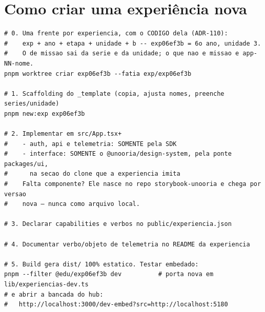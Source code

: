 \section{Como criar uma experiência nova}

\begin{lstlisting}[language=bashunoo, caption={O caminho completo}, label={lst:novaexp}]
# 0. Uma frente por experiencia, com o CODIGO dela (ADR-110):
#    exp + ano + etapa + unidade + b -- exp06ef3b = 6o ano, unidade 3.
#    O de missao sai da serie e da unidade; o que nao e missao e app-NN-nome.
pnpm worktree criar exp06ef3b --fatia exp/exp06ef3b

# 1. Scaffolding do _template (copia, ajusta nomes, preenche series/unidade)
pnpm new:exp exp06ef3b

# 2. Implementar em src/App.tsx+
#    - auth, api e telemetria: SOMENTE pela SDK
#    - interface: SOMENTE o @unooria/design-system, pela ponte packages/ui,
#      na secao do clone que a experiencia imita
#    Falta componente? Ele nasce no repo storybook-unooria e chega por versao
#    nova — nunca como arquivo local.

# 3. Declarar capabilities e verbos no public/experiencia.json

# 4. Documentar verbo/objeto de telemetria no README da experiencia

# 5. Build gera dist/ 100% estatico. Testar embedado:
pnpm --filter @edu/exp06ef3b dev          # porta nova em lib/experiencias-dev.ts
# e abrir a bancada do hub:
#   http://localhost:3000/dev-embed?src=http://localhost:5180
\end{lstlisting}

